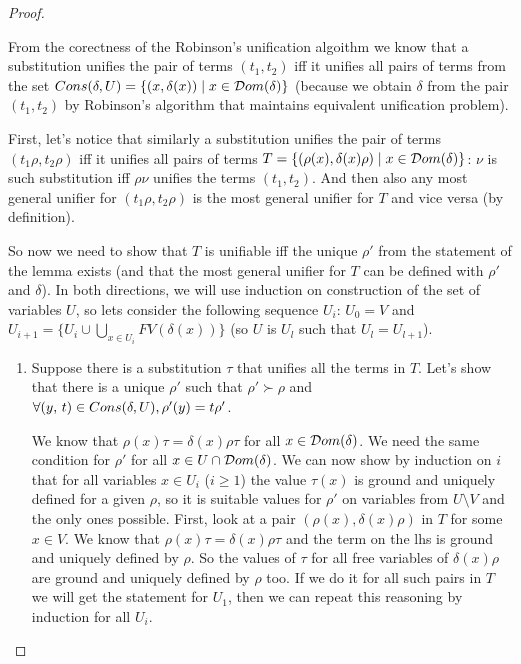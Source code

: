 \begin{proof} $ $

From the corectness of the Robinson's unification algoithm we know that a substitution unifies the pair of terms $(t_1, t_2)$ iff it unifies all pairs of terms from the set $Cons(\delta, U) = \{ (x, \delta(x)) \mid x \in \mathcal{D}om(\delta) \}$ (because we obtain $\delta$ from the pair $(t_1, t_2)$ by Robinson's algorithm that maintains equivalent unification problem).

First, let's notice that similarly a substitution unifies the pair of terms $(t_1 \rho, t_2 \rho)$ iff it unifies all pairs of terms  $T = \{ (\rho(x), \delta(x) \rho) \mid x \in \mathcal{D}om(\delta) \}$: $\nu$ is such substitution iff $\rho \nu$ unifies the terms $(t_1, t_2)$. And then also any most general unifier for $(t_1 \rho, t_2 \rho)$ is the most general unifier for $T$ and vice versa (by definition).

So now we need to show that $T$ is unifiable iff the unique $\rho'$ from the statement of the lemma exists (and that the most general unifier for $T$ can be defined with $\rho'$ and $\delta$). In both directions, we will use induction on construction of the set of variables $U$, so lets consider the following sequence $U_i$: $U_0 = V$ and $U_{i+1} = \{ U_i \cup \bigcup\limits_{x \in U_{i}} FV(\delta(x)) \}$ (so $U$ is $U_l$ such that $U_l = U_{l + 1}$).

\begin{enumerate}
\item Suppose there is a substitution $\tau$ that unifies all the terms in $T$. Let's show that there is a unique $\rho'$ such that $\rho' \succ \rho$ and $\forall (y, \, t) \in Cons(\delta, U), \\ \rho'(y) = t \rho'$.

We know that $\rho(x) \tau = \delta(x) \rho \tau$ for all $x \in \mathcal{D}om(\delta)$. We need the same condition for $\rho'$ for all $x \in U \cap \mathcal{D}om(\delta)$. We can now show by induction on $i$ that for all variables $x \in U_i$ ($i \ge 1$) the value $\tau(x)$ is ground and uniquely defined for a given $\rho$, so it is suitable values for $\rho'$ on variables from $U \setminus V$ and the only ones possible. First, look at a pair $(\rho(x), \delta(x) \rho)$ in $T$ for some $x \in V$. We know that $\rho(x) \tau = \delta(x) \rho \tau$ and the term on the lhs is ground and uniquely defined by $\rho$. So the values of $\tau$ for all free variables of $\delta(x) \rho$ are ground and uniquely defined by $\rho$ too. If we do it for all such pairs in $T$ we will get the statement for $U_1$, then we can repeat this reasoning by induction for all $U_i$.


\end{enumerate}
\end{proof}
